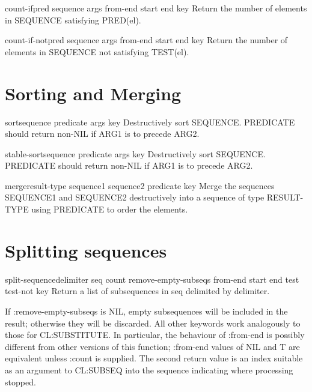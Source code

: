 \documentclass[10pt,english]{book}
\begin{document}
\begin{function}{count-if}{pred sequence \rest args \key from-end start end key}
  Return the number of elements in SEQUENCE satisfying PRED(el).
\end{function}

\begin{function}{count-if-not}{pred sequence \rest args \key from-end start end key}
  Return the number of elements in SEQUENCE not satisfying TEST(el).
\end{function}

\section{Sorting and Merging}
\label{sec:sorting-merging}

\begin{function}{sort}{sequence predicate \rest args \key key}
  Destructively sort SEQUENCE. PREDICATE should return non-NIL if
  ARG1 is to precede ARG2.
\end{function}

\begin{function}{stable-sort}{sequence predicate \rest args \key key}
  Destructively sort SEQUENCE. PREDICATE should return non-NIL if
  ARG1 is to precede ARG2.
\end{function}

\begin{function}{merge}{result-type sequence1 sequence2 predicate \key key}
  Merge the sequences SEQUENCE1 and SEQUENCE2 destructively into a
  sequence of type RESULT-TYPE using PREDICATE to order the elements.
\end{function}

\section{Splitting sequences}
\label{sec:splitting-sequences}

\begin{function}{split-sequence}{delimiter seq \key count
    remove-empty-subseqs from-end start end test test-not key}
  Return a list of subsequences in seq delimited by delimiter.

  If :remove-empty-subseqs is NIL, empty subsequences will be included
  in the result; otherwise they will be discarded.  All other keywords
  work analogously to those for CL:SUBSTITUTE.  In particular, the
  behaviour of :from-end is possibly different from other versions of
  this function; :from-end values of NIL and T are equivalent unless
  :count is supplied. The second return value is an index suitable as an
  argument to CL:SUBSEQ into the sequence indicating where processing
  stopped.
\end{function}
\end{document}
